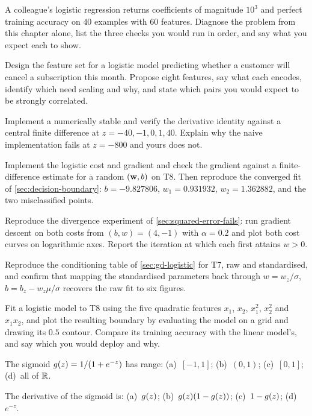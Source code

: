 \dpr A colleague's logistic regression returns coefficients of magnitude $10^{3}$
and perfect training accuracy on $40$ examples with $60$ features. Diagnose the
problem from this chapter alone, list the three checks you would run in order,
and say what you expect each to show.

\dpr Design the feature set for a logistic model predicting whether a customer
will cancel a subscription this month. Propose eight features, say what each
encodes, identify which need scaling and why, and state which pairs you would
expect to be strongly correlated.


\pe Implement a numerically stable  and verify the derivative
identity against a central finite difference at $z = -40, -1, 0, 1, 40$.
Explain why the naive implementation fails at $z = -800$ and yours does not.

\pe Implement the logistic cost and gradient and check the gradient against a
finite-difference estimate for a random $(\mathbf{w},b)$ on T8. Then reproduce the
converged fit of \cref{sec:decision-boundary}: $b = -9.827806$,
$w_1 = 0.931932$, $w_2 = 1.362882$, and the two misclassified points.

\pe Reproduce the divergence experiment of \cref{sec:squared-error-fails}: run
gradient descent on both costs from $(b,w) = (4,-1)$ with $\alpha = 0.2$ and
plot both cost curves on logarithmic axes. Report the iteration at which each
first attains $w > 0$.

\pe Reproduce the conditioning table of \cref{sec:gd-logistic} for T7, raw and
standardised, and confirm that mapping the standardised parameters back through
$w = w_z/\sigma$, $b = b_z - w_z\mu/\sigma$ recovers the raw fit to six figures.

\pe Fit a logistic model to T8 using the five quadratic features $x_1$, $x_2$,
$x_1^2$, $x_2^2$ and $x_1x_2$, and plot the resulting boundary by evaluating the
model on a grid and drawing its $0.5$ contour. Compare its training accuracy
with the linear model's, and say which you would deploy and why.


\qz The sigmoid $g(z) = 1/(1+e^{-z})$ has range: (a)~$[-1,1]$; (b)~$(0,1)$;
(c)~$[0,1]$; (d)~all of $\mathbb{R}$.

\qz The derivative of the sigmoid is: (a)~$g(z)$; (b)~$g(z)(1-g(z))$;
(c)~$1-g(z)$; (d)~$e^{-z}$.

